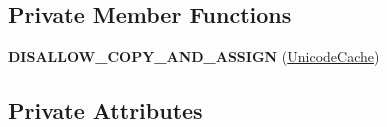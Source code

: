 \subsection*{Private Member Functions}
\begin{DoxyCompactItemize}
\item 
{\bfseries D\+I\+S\+A\+L\+L\+O\+W\+\_\+\+C\+O\+P\+Y\+\_\+\+A\+N\+D\+\_\+\+A\+S\+S\+I\+GN} (\hyperlink{classv8_1_1internal_1_1_unicode_cache}{Unicode\+Cache})\hypertarget{classv8_1_1internal_1_1_unicode_cache_ae84288d1364ce3f3a1e5e5acd2c31f05}{}\label{classv8_1_1internal_1_1_unicode_cache_ae84288d1364ce3f3a1e5e5acd2c31f05}

\end{DoxyCompactItemize}
\subsection*{Private Attributes}
